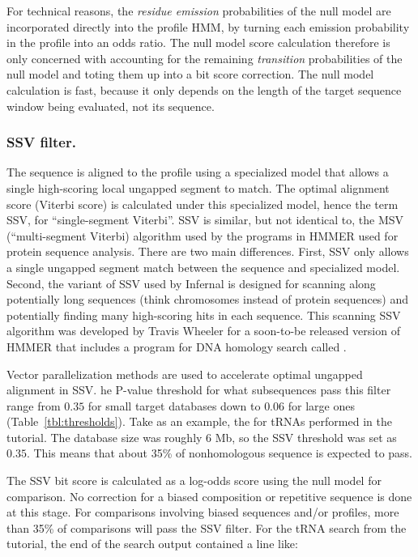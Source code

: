 For technical reasons, the \emph{residue emission} probabilities of
the null model are incorporated directly into the profile HMM, by
turning each emission probability in the profile into an odds
ratio. The null model score calculation therefore is only concerned
with accounting for the remaining \emph{transition} probabilities of
the null model and toting them up into a bit score correction.  The
null model calculation is fast, because it only depends on the length
of the target sequence window being evaluated, not its sequence.

\subsubsection{SSV filter.}

The sequence is aligned to the profile using a specialized model that
allows a single high-scoring local ungapped segment to match.  The
optimal alignment score (Viterbi score) is calculated under this
specialized model, hence the term SSV, for ``single-segment
Viterbi''. SSV is similar, but not identical to, the MSV
(``multi-segment Viterbi) algorithm used by the programs in HMMER used
for protein sequence analysis. There are two main differences. First,
SSV only allows a single ungapped segment match between the sequence
and specialized model. Second, the variant of SSV used by Infernal is
designed for scanning along potentially long sequences (think
chromosomes instead of protein sequences) and potentially finding many
high-scoring hits in each sequence. This scanning SSV algorithm was
developed by Travis Wheeler for a soon-to-be released version of HMMER
that includes a program for DNA homology search called .

Vector parallelization methods are used to accelerate optimal ungapped
alignment in SSV.  he P-value threshold for what subsequences pass
this filter range from $0.35$ for small target databases down to
$0.06$ for large ones (Table~\ref{tbl:thresholds}). Take as an
example, the  for tRNAs performed in the tutorial. The
database size was roughly 6 Mb, so the SSV threshold was set as
$0.35$. This means that about 35\% of nonhomologous sequence is
expected to pass.

The SSV bit score is calculated as a log-odds score using the null
model for comparison. No correction for a biased composition or
repetitive sequence is done at this stage. For comparisons involving
biased sequences and/or profiles, more than 35\% of comparisons will
pass the SSV filter. For the tRNA search from the tutorial, the end of
the search output contained a line like:

